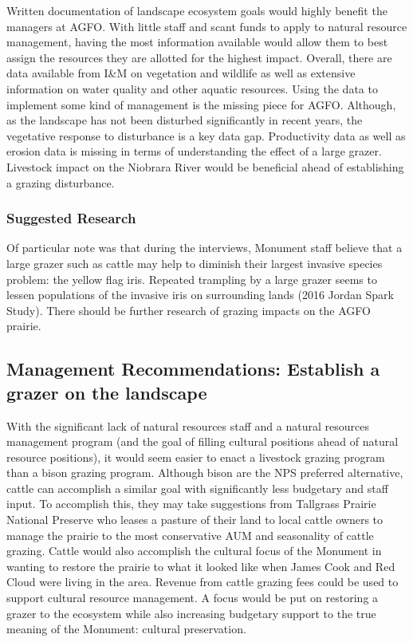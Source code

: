 Written documentation of landscape ecosystem goals would highly benefit the managers at AGFO. 
With little staff and scant funds to apply to natural resource management, having the most information available would allow them to best assign the resources they are allotted for the highest impact. 
Overall, there are data available from I\&M on vegetation and wildlife as well as extensive information on water quality and other aquatic resources. 
Using the data to implement some kind of management is the missing piece for AGFO. 
Although, as the landscape has not been disturbed significantly in recent years, the vegetative response to disturbance is a key data gap. 
Productivity data as well as erosion data is missing in terms of understanding the effect of a large grazer.
Livestock impact on the Niobrara River would be beneficial ahead of establishing a grazing disturbance.

\subsubsection{Suggested Research}

Of particular note was that during the interviews, Monument staff believe that a large grazer such as cattle may help to diminish their largest invasive species problem: the yellow flag iris. 
Repeated trampling by a large grazer seems to lessen populations of the invasive iris on surrounding lands (2016 Jordan Spark Study). 
There should be further research of grazing impacts on the AGFO prairie.

\subsection{Management Recommendations: Establish a grazer on the landscape}

With the significant lack of natural resources staff and a natural resources management program (and the goal of filling cultural positions ahead of natural resource positions), it would seem easier to enact a livestock grazing program than a bison grazing program. 
Although bison are the NPS preferred alternative, cattle can accomplish a similar goal with significantly less budgetary and staff input. 
To accomplish this, they may take suggestions from Tallgrass Prairie National Preserve who leases a pasture of their land to local cattle owners to manage the prairie to the most conservative AUM and seasonality of cattle grazing.
Cattle would also accomplish the cultural focus of the Monument in wanting to restore the prairie to what it looked like when James Cook and Red Cloud were living in the area.
Revenue from cattle grazing fees could be used to support cultural resource management. 
A focus would be put on restoring a grazer to the ecosystem while also increasing budgetary support to the true meaning of the Monument: cultural preservation.

